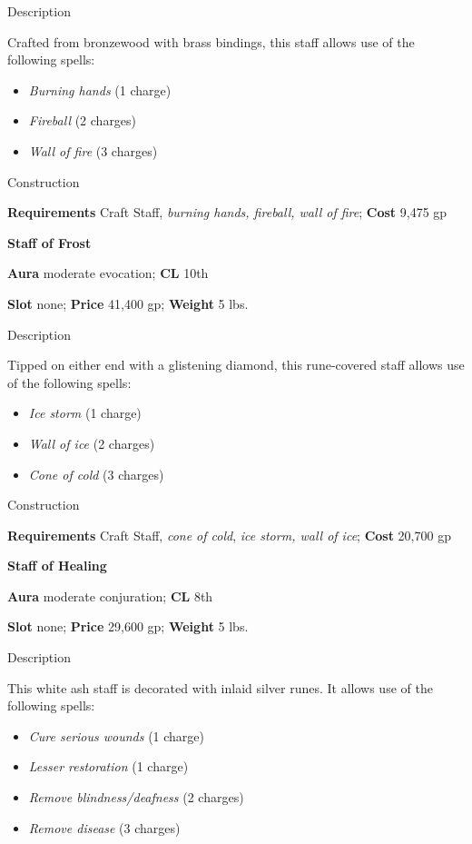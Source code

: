 Description
				
Crafted from bronzewood with brass bindings, this staff allows use of the following spells:
				\begin{itemize}\item  \textit{Burning hands }(1 charge)
				\item  \textit{Fireball }(2 charges)
				\item  \textit{Wall of fire }(3 charges)
\end{itemize}
				
Construction
				
\textbf{Requirements }Craft Staff, \textit{burning hands, fireball, wall of fire}; \textbf{Cost} 9,475 gp
				
\textbf{Staff of Frost}
				
\textbf{Aura} moderate evocation; \textbf{CL} 10th
				
\textbf{Slot }none; \textbf{Price} 41,400 gp; \textbf{Weight} 5 lbs.
				
Description
				
Tipped on either end with a glistening diamond, this rune-covered staff allows use of the following spells:
				\begin{itemize}\item  \textit{Ice storm }(1 charge)
				\item  \textit{Wall of ice }(2 charges)
				\item  \textit{Cone of cold }(3 charges)
\end{itemize}
				
Construction
				
\textbf{Requirements }Craft Staff, \textit{cone of cold}, \textit{ice storm, wall of ice}; \textbf{Cost} 20,700 gp
				
\textbf{Staff of Healing}
				
\textbf{Aura} moderate conjuration;\textbf{ CL }8th
				
\textbf{Slot} none; \textbf{Price} 29,600 gp; \textbf{Weight} 5 lbs.
				
Description
				
This white ash staff is decorated with inlaid silver runes. It allows use of the following spells:
				\begin{itemize}\item  \textit{Cure serious wounds} (1 charge)
				\item  \textit{Lesser restoration} (1 charge)
				\item  \textit{Remove blindness/deafness} (2 charges)
				\item  \textit{Remove disease} (3 charges) 
\end{itemize}
				
